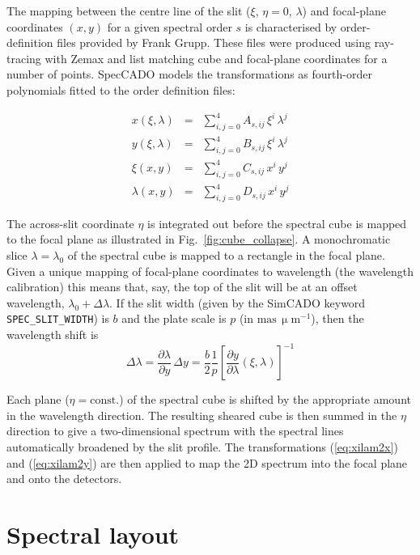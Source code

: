 \documentclass[a4paper,twoside,11pt]{article}
\newcommand{\micron}{\upmu\mathrm{m}}
\begin{document}
The mapping between the centre line of the slit ($\xi$, $\eta=0$,
$\lambda$) and focal-plane coordinates $(x, y)$ for a given spectral
order $s$ is characterised by order-definition files provided by Frank
Grupp. These files were produced using ray-tracing with Zemax and list
matching cube and focal-plane coordinates for a number of
points. SpecCADO models the transformations as fourth-order
polynomials fitted to the order definition files:

\begin{eqnarray}
  x(\xi, \lambda) &=& \sum_{i,j=0}^{4} A_{s,ij}\,\xi^{i}\,\lambda^{j} \label{eq:xilam2x} \\
  y(\xi, \lambda) &=& \sum_{i,j=0}^{4} B_{s,ij}\,\xi^{i}\,\lambda^{j} \label{eq:xilam2y} \\
  \xi(x, y)     &=& \sum_{i,j=0}^{4} C_{s,ij}\,x^{i}\,y^{j} \label{eq:xy2xi} \\
  \lambda(x, y) &=& \sum_{i,j=0}^{4} D_{s,ij}\,x^{i}\,y^{j} \label{eq:xy2lam}
\end{eqnarray}

The across-slit coordinate $\eta$ is integrated out before the
spectral cube is mapped to the focal plane as illustrated in
Fig.~\ref{fig:cube_collapse}. A monochromatic slice
$\lambda=\lambda_{0}$ of the spectral cube is mapped to a rectangle in
the focal plane. Given a unique mapping of focal-plane coordinates to
wavelength (the wavelength calibration) this means that, say, the top
of the slit will be at an offset wavelength,
$\lambda_{0}+\Delta\lambda$. If the slit width (given by the SimCADO
keyword \lstinline{SPEC_SLIT_WIDTH}) is $b$ and the plate scale is $p$
(in $\mathrm{mas}\,\micron^{-1}$), then the wavelength shift is
\begin{equation}
  \Delta\lambda = \frac{\partial\lambda}{\partial y}\,\Delta y
  = \frac{b}{2}\frac{1}{p} \left[\frac{\partial y}{\partial
      \lambda}(\xi, \lambda)\right]^{-1}
\end{equation}

Each plane ($\eta = \mathrm{const.}$) of the spectral cube is shifted
by the appropriate amount in the wavelength direction. The resulting
sheared cube is then summed in the $\eta$ direction to give a
two-dimensional spectrum with the spectral lines automatically
broadened by the slit profile. The transformations (\ref{eq:xilam2x})
and (\ref{eq:xilam2y}) are then applied to map the 2D spectrum into
the focal plane and onto the detectors.


\section{Spectral layout}
\label{sec:spectral_layout}
\end{document}
